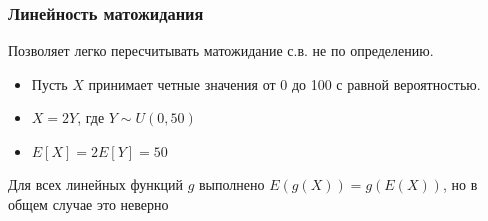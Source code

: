 \documentclass[hyperref=unicode,graphics=pdflatex,13pt,xcolor={usenames,dvipsnames}]{beamer}
\renewcommand\emph[1]{{\color{blue}{#1}}}
\begin{document}
\begin{frame}
  \frametitle{Линейность матожидания}
  \begin{center}
  \end{center}

  \pause
  Позволяет легко пересчитывать матожидание с.в. не по определению.
  
  \begin{itemize}
    \item Пусть $X$ принимает четные значения от 0 до 100 с равной вероятностью.
    \item $X = 2Y$, где $Y \sim U(0, 50)$
    \item $E[X] = 2E[Y] = 50$
  \end{itemize}
  
  \pause \emph{NB:} Для всех линейных функций $g$ выполнено $E(g(X)) = g(E(X))$, но в общем случае это неверно

\end{frame}
\end{document}
